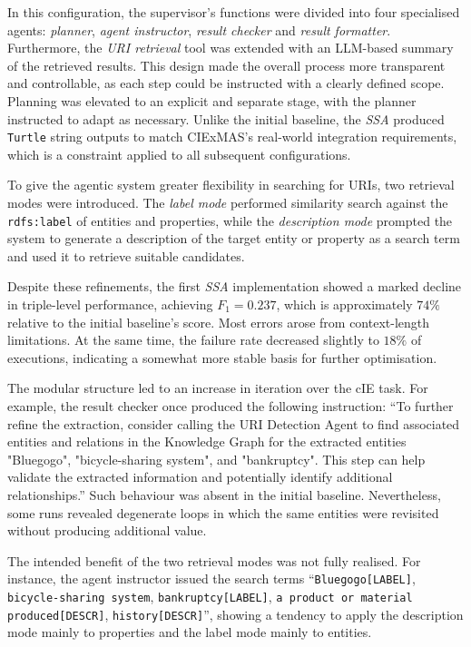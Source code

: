 \documentclass[a4paper,oneside,bibliography=totoc]{scrbook}
\begin{document}
In this configuration, the supervisor’s functions were divided into four specialised agents: \textit{planner}, \textit{agent instructor}, \textit{result checker} and \textit{result formatter}. Furthermore, the \textit{\ac{URI} retrieval} tool was extended with an \ac{LLM}-based summary of the retrieved results. This design made the overall process more transparent and controllable, as each step could be instructed with a clearly defined scope. Planning was elevated to an explicit and separate stage, with the planner instructed to adapt as necessary. Unlike the initial baseline, the \textit{\ac{SSA}} produced \texttt{Turtle} string outputs to match CIExMAS’s real-world integration requirements, which is a constraint applied to all subsequent configurations.

To give the agentic system greater flexibility in searching for \acp{URI}, two retrieval modes were introduced. The \textit{label mode} performed similarity search against the \texttt{rdfs:label} of entities and properties, while the \textit{description mode} prompted the system to generate a description of the target entity or property as a search term and used it to retrieve suitable candidates.

Despite these refinements, the first \textit{\ac{SSA}} implementation showed a marked decline in triple-level performance, achieving $F_{1}=0.237$, which is approximately \(74\%\) relative to the initial baseline’s score. Most errors arose from context-length limitations. At the same time, the failure rate decreased slightly to \(18\%\) of executions, indicating a somewhat more stable basis for further optimisation.

The modular structure led to an increase in iteration over the \ac{cIE} task. For example, the result checker once produced the following instruction: \enquote{To further refine the extraction, consider calling the \ac{URI} Detection Agent to find associated entities and relations in the Knowledge Graph for the extracted entities "Bluegogo", "bicycle-sharing system", and "bankruptcy". This step can help validate the extracted information and potentially identify additional relationships.} Such behaviour was absent in the initial baseline. Nevertheless, some runs revealed degenerate loops in which the same entities were revisited without producing additional value.

The intended benefit of the two retrieval modes was not fully realised. For instance, the agent instructor issued the search terms \enquote{\texttt{Bluegogo[LABEL]}, \texttt{bicycle-sharing system\allowbreak[LABEL]}, \texttt{bankruptcy[LABEL]}, \texttt{a product or material produced[DESCR]}, \texttt{history[DESCR]}}, showing a tendency to apply the description mode mainly to properties and the label mode mainly to entities.
\end{document}
